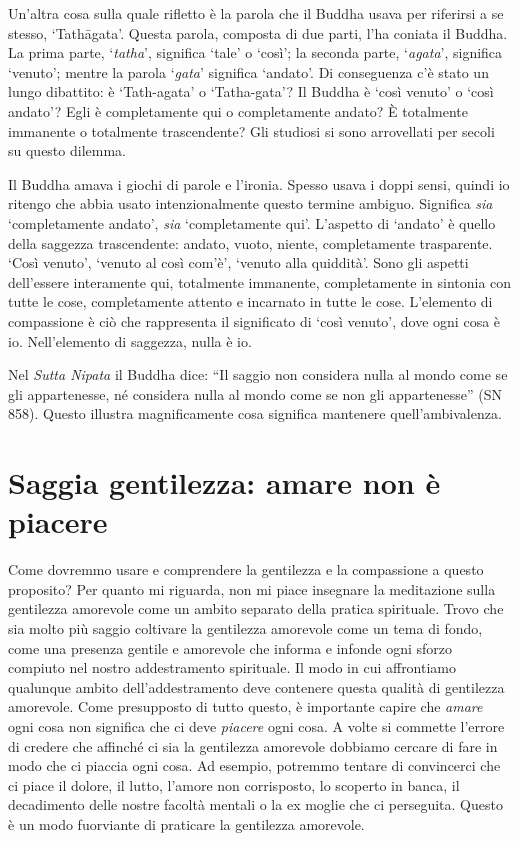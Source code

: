 Un'altra cosa sulla quale rifletto è la parola che il Buddha usava per riferirsi a se stesso, `Tathāgata'. Questa parola, composta di due parti, l'ha coniata il Buddha. La prima parte, `\textit{tatha}', significa `tale' o `così'; la seconda parte, `\textit{agata}', significa `venuto'; mentre la parola `\textit{gata}' significa `andato'. Di conseguenza c'è stato un lungo dibattito: è `Tath-agata' o `Tatha-gata'? Il Buddha è `così venuto' o `così andato'? Egli è completamente qui o completamente andato? È totalmente immanente o totalmente trascendente? Gli studiosi si sono arrovellati per secoli su questo dilemma.

Il Buddha amava i giochi di parole e l'ironia. Spesso usava i doppi sensi, quindi io ritengo che abbia usato intenzionalmente questo termine ambiguo. Significa \textit{sia} `completamente andato', \textit{sia }`completamente qui'. L'aspetto di `andato' è quello della saggezza trascendente: andato, vuoto, niente, completamente trasparente. `Così venuto', `venuto al così com'è', `venuto alla quiddità'. Sono gli aspetti dell'essere interamente qui, totalmente immanente, completamente in sintonia con tutte le cose, completamente attento e incarnato in tutte le cose. L'elemento di compassione è ciò che rappresenta il significato di `così venuto', dove ogni cosa è io. Nell'elemento di saggezza, nulla è io. 

Nel \textit{Sutta Nipata} il Buddha dice: ``Il saggio non considera nulla al mondo come se gli appartenesse, né considera nulla al mondo come se non gli appartenesse'' (SN 858). Questo illustra magnificamente cosa significa mantenere quell'ambivalenza.

\section*{Saggia gentilezza: amare non \`e piacere}

Come dovremmo usare e comprendere la gentilezza e la compassione a questo proposito? Per quanto mi riguarda, non mi piace insegnare la meditazione sulla gentilezza amorevole come un ambito separato della pratica spirituale. Trovo che sia molto più saggio coltivare la gentilezza amorevole come un tema di fondo, come una presenza gentile e amorevole che informa e infonde ogni sforzo compiuto nel nostro addestramento spirituale. Il modo in cui affrontiamo qualunque ambito dell'addestramento deve contenere questa qualità di gentilezza amorevole. Come presupposto di tutto questo, è importante capire che \textit{amare} ogni cosa non significa che ci deve \textit{piacere} ogni cosa. A volte si commette l'errore di credere che affinché ci sia la gentilezza amorevole dobbiamo cercare di fare in modo che ci piaccia ogni cosa. Ad esempio, potremmo tentare di convincerci che ci piace il dolore, il lutto, l'amore non corrisposto, lo scoperto in banca, il decadimento delle nostre facoltà mentali o la ex moglie che ci perseguita. Questo è un modo fuorviante di praticare la gentilezza amorevole.

